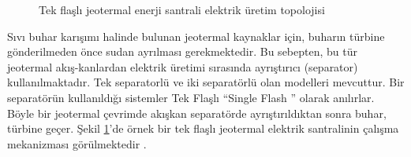 \begin{figure}[htbp]


\caption{Tek flaşlı jeotermal enerji santrali elektrik üretim topolojisi}
\label{fig:singleflash}
\end{figure}

Sıvı buhar karışımı halinde bulunan jeotermal kaynaklar için, buharın türbine gönderilmeden önce sudan ayrılması gerekmektedir. Bu sebepten, bu tür jeotermal akış-kanlardan elektrik üretimi sırasında ayrıştırıcı (separator) kullanılmaktadır. Tek separatorlü ve iki separatörlü olan modelleri mevcuttur. Bir separatörün kullanıldığı sistemler Tek Flaşlı “Single Flash ” olarak anılırlar. Böyle bir jeotermal çevrimde akışkan separatörde ayrıştırıldıktan sonra buhar, türbine geçer. Şekil \ref{fig:singleflash}'de örnek bir tek flaşlı jeotermal elektrik santralinin çalışma mekanizması görülmektedir \cite{dipippo2012geothermal}.

